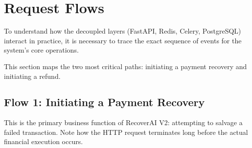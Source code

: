 
\section{Request Flows}

\begin{tcolorbox}[summarybox={\iconFlow[1.5] Step-by-Step Execution Lifecycle}]
\color{textdark}
To understand how the decoupled layers (FastAPI, Redis, Celery, PostgreSQL) interact in practice, it is necessary to trace the exact sequence of events for the system's core operations.

This section maps the two most critical paths: initiating a payment recovery and initiating a refund.
\end{tcolorbox}

\vspace{0.8cm}

\subsection{Flow 1: Initiating a Payment Recovery}

This is the primary business function of RecoverAI V2: attempting to salvage a failed transaction. Note how the HTTP request terminates long before the actual financial execution occurs.

